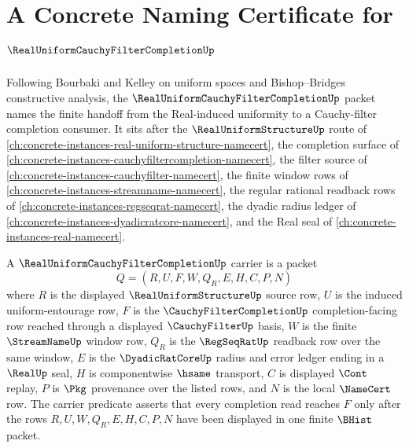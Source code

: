 \chapter{A Concrete Naming Certificate for $\RealUniformCauchyFilterCompletionUp$}
\label{ch:concrete-instances-real-uniform-cauchy-filter-completion-namecert}

Following Bourbaki and Kelley on uniform spaces and Bishop--Bridges constructive analysis, the $\RealUniformCauchyFilterCompletionUp$ packet names the finite handoff from the Real-induced uniformity to a Cauchy-filter completion consumer. It sits after the $\RealUniformStructureUp$ route of \autoref{ch:concrete-instances-real-uniform-structure-namecert}, the completion surface of \autoref{ch:concrete-instances-cauchyfiltercompletion-namecert}, the filter source of \autoref{ch:concrete-instances-cauchyfilter-namecert}, the finite window rows of \autoref{ch:concrete-instances-streamname-namecert}, the regular rational readback rows of \autoref{ch:concrete-instances-regseqrat-namecert}, the dyadic radius ledger of \autoref{ch:concrete-instances-dyadicratcore-namecert}, and the Real seal of \autoref{ch:concrete-instances-real-namecert}.

\begin{definition}
\label{def:real-uniform-cauchy-filter-completion-carrier}
A $\RealUniformCauchyFilterCompletionUp$ carrier is a packet
$$
Q=(R,U,F,W,Q_R,E,H,C,P,N)
$$
where $R$ is the displayed $\RealUniformStructureUp$ source row, $U$ is the induced uniform-entourage row, $F$ is the $\CauchyFilterCompletionUp$ completion-facing row reached through a displayed $\CauchyFilterUp$ basis, $W$ is the finite $\StreamNameUp$ window row, $Q_R$ is the $\RegSeqRatUp$ readback row over the same window, $E$ is the $\DyadicRatCoreUp$ radius and error ledger ending in a $\RealUp$ seal, $H$ is componentwise $\hsame$ transport, $C$ is displayed $\Cont$ replay, $P$ is $\Pkg$ provenance over the listed rows, and $N$ is the local $\NameCert$ row. The carrier predicate asserts that every completion read reaches $F$ only after the rows $R,U,W,Q_R,E,H,C,P,N$ have been displayed in one finite $\BHist$ packet.
\end{definition}

